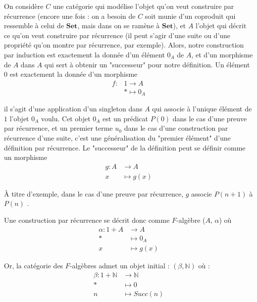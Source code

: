 \documentclass{article}
\newcommand{\N}{\mathbb{N}}
\begin{document}
On considère $C$ une catégorie qui modélise l'objet qu'on veut construire par récurrence (encore une fois : on a besoin de $C$ soit munie d'un coproduit qui ressemble à celui de $\mathbf{Set}$, mais dans on se ramène à $\mathbf{Set}$), et $A$ l'objet qui décrit ce qu'on veut construire par récurrence (il peut s'agir d'une suite ou d'une propriété qu'on montre par récurrence, par exemple). Alors, notre construction par induction est exactement la donnée d'un élément $0_A$ de $A$, et d'un morphisme de $A$ dans $A$ qui sert à obtenir un "successeur" pour notre définition. Un élément $0$ est exactement la donnée d'un morphisme  
\begin{align*}
f : & 1  \rightarrow A \\
    & * \mapsto 0_A
\end{align*}

il s'agit d'une application d'un singleton dans $A$ qui associe à l'unique élément de $1$ l'objet $0_A$ voulu. Cet objet $0_A$ est un prédicat $P(0)$ dans le cas d'une preuve par récurrence, et un premier terme $u_0$ dans le cas d'une construction par récurrence d'une suite, c'est une généralisation du "premier élément" d'une définition par récurrence. Le "successeur" de la définition peut se définir comme un morphisme 
\begin{align*}
    g : A &  \rightarrow A \\ 
        x & \mapsto g(x)
\end{align*}

À titre d'exemple, dans le cas d'une preuve par récurrence, $g$ associe $P(n+1)$ à $P(n)$ .
    
     Une construction par récurrence se décrit donc comme $F$-algèbre ($A$, $\alpha$) où
\begin{align*}
    \alpha : 1 + A & \rightarrow A \\ 
    * & \mapsto 0_A \\ 
    x & \mapsto g(x)
\end{align*}

Or, la catégorie des $F$-algèbres admet un objet initial : $(\beta, \N)$ où : 
\begin{align*}
\beta : 1 + \N & \rightarrow \N \\
        * & \mapsto 0 \\ 
        n & \mapsto Succ(n)
\end{align*}
\end{document}

